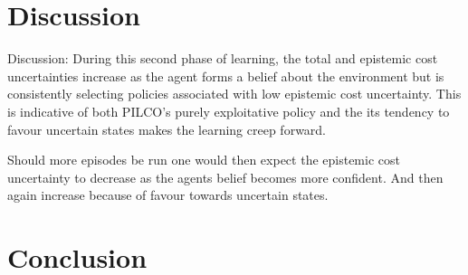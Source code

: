 \section{Discussion}
Discussion:
During this second phase of learning, the total and epistemic cost uncertainties increase as the agent forms a belief about the environment but is consistently selecting policies associated with low epistemic cost uncertainty. This is indicative of both PILCO's purely exploitative policy and the its tendency to favour uncertain states makes the learning creep forward.

Should more episodes be run one would then expect the epistemic cost uncertainty to decrease as the agents belief becomes more confident. And then again increase because of favour towards uncertain states.
\section{Conclusion}



